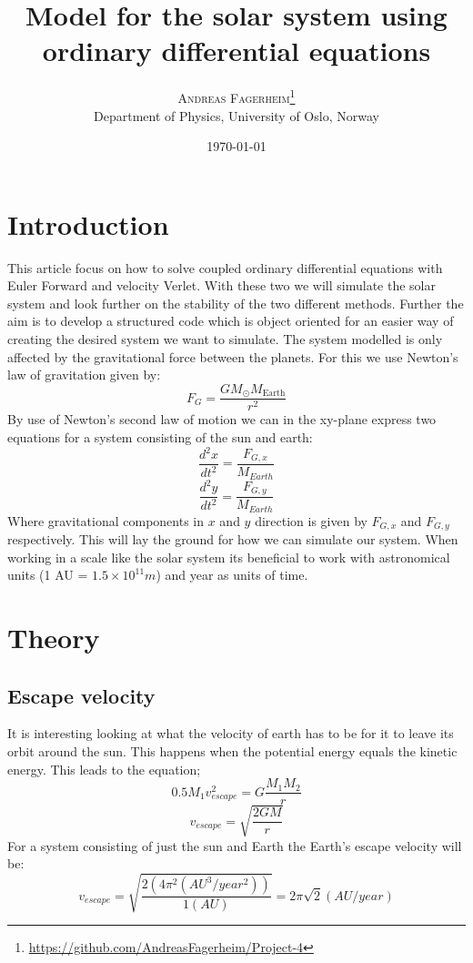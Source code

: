 \documentclass[twoside,twocolumn]{article}
\title{Model for the solar system using ordinary differential equations } %
\author{%
\textsc{Andreas Fagerheim}\thanks{\url{https://github.com/AndreasFagerheim/Project-4}} \\[1ex] %
\normalsize Department of Physics, University of Oslo, Norway \\ %
}
\date{\today} %
\begin{document}
\maketitle

\section{Introduction}
This article focus on how to solve coupled ordinary differential equations with Euler Forward and velocity Verlet. With these two we will simulate the solar system and look further on the stability of the two different methods. Further the aim is to develop a structured code which is object oriented for an easier way of creating the desired system we want to simulate.
The system modelled is only affected by the gravitational force between the planets. For this we use Newton's law of gravitation given by:
\begin{equation}
F_G=\frac{GM_{\odot}M_{\mathrm{Earth}}}{r^2}
\end{equation}
By use of Newton's second law of motion we can in the xy-plane express two equations for a system consisting of the sun and earth:
\[
\frac{d^2x}{dt^2}= \frac{F_{G,x}}{M_{Earth}}
\]
\[
\frac{d^2y}{dt^2}= \frac{F_{G,y}}{M_{Earth}}
\]
Where gravitational components in $x$ and $y$ direction is given by $F_{G,x}$ and $F_{G,y}$ respectively. This will lay the ground for how we can simulate our system. When working in a scale like the solar system its beneficial to work with astronomical units (1 AU = $1.5 \times 10^{11} m$) and year as units of time.
\section{Theory}

\subsection{Escape velocity}
It is interesting looking at what the velocity of earth has to be for it to leave its orbit around the sun. This happens when the potential energy equals the kinetic energy. This leads to the equation;
\begin{equation}
0.5M_1v_{escape}^2 = G\frac{M_1M_2}{r}
\end{equation}
\begin{equation}
v_{escape}= \sqrt{\frac{2GM}{r}} 
\end{equation}
For a system consisting of just the sun and Earth the Earth's escape velocity will be:
\begin{equation}
v_{escape}= \sqrt{\frac{2(4\pi^2 (AU^3/year^2))}{1 (AU)}} = 2\pi \sqrt{2} (AU/year)
\end{equation}
\end{document}
